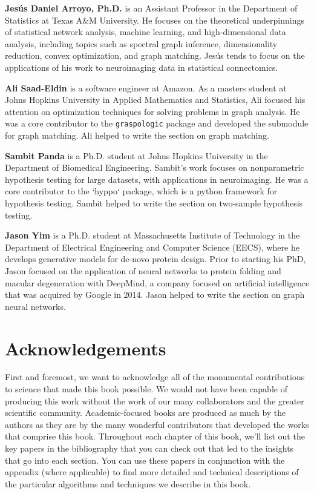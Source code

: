 \textbf{Jes{\'u}s Daniel Arroyo, Ph.D.} is an Assistant Professor in the Department of Statistics at Texas A\&M University. He focuses on the theoretical underpinnings of statistical network analysis, machine learning, and high-dimensional data analysis, including topics such as spectral graph inference, dimensionality reduction, convex optimization, and graph matching. Jes\'us tends to focus on the applications of his work to neuroimaging data in statistical connectomics.

\noindent\textbf{Ali Saad-Eldin} is a software engineer at Amazon. As a masters student at Johns Hopkins University in Applied Mathematics and Statistics, Ali focused his attention on optimization techniques for solving problems in graph analysis. He was a core contributor to the \texttt{graspologic} package and developed the submodule for graph matching. Ali helped to write the section on graph matching.

\noindent\textbf{Sambit Panda} is a Ph.D. student at Johns Hopkins University in the Department of Biomedical Engineering. Sambit's work focuses on nonparametric hypothesis testing for large datasets, with applications in neuroimaging. He was a core contributor to the `hyppo` package, which is a python framework for hypothesis testing. Sambit helped to write the section on two-sample hypothesis testing.

\noindent\textbf{Jason Yim} is a Ph.D. student at Massachusetts Institute of Technology in the Department of Electrical Engineering and Computer Science (EECS), where he develops generative models for de-novo protein design. Prior to starting his PhD, Jason focused on the application of neural networks to protein folding and macular degeneration with DeepMind, a company focused on artificial intelligence that was acquired by Google in 2014. Jason helped to write the section on graph neural networks.

\section*{Acknowledgements}

First and foremost, we want to acknowledge all of the monumental contributions to science that made this book possible. We would not have been capable of producing this work without the work of our many collaborators and the greater scientific community. Academic-focused books are produced as much by the authors as they are by the many wonderful contributors that developed the works that comprise this book. Throughout each chapter of this book, we'll list out the key papers in the bibliography that you can check out that led to the insights that go into each section. You can use these papers in conjunction with the appendix (where applicable) to find more detailed and technical descriptions of the particular algorithms and techniques we describe in this book. 

